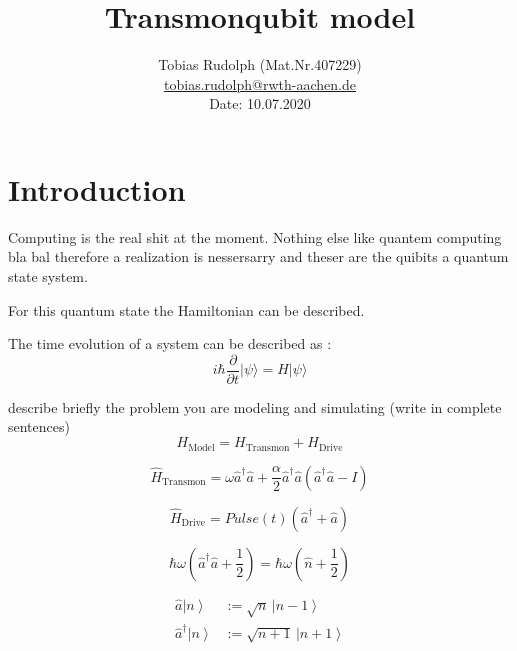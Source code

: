 \documentclass[journal]{IEEEtran} %
\newcommand{\mtx}[1]{\mathrm{#1}} %
\begin{document}
\title{Transmonqubit model}
%
\author{Tobias Rudolph (Mat.Nr.407229) \\ \href{mailto:tobias.rudolph@rwth-aachen.de}{tobias.rudolph@rwth-aachen.de} \\
Date: 10.07.2020
}

\maketitle
\begin{abstract}


\end{abstract}



\section{Introduction}\label{intro}
 Computing is the real shit at the moment. Nothing else like quantem computing bla bal therefore a realization is nessersarry and theser are the quibits a quantum state system. 


For this quantum state the Hamiltonian can be described.

The time evolution of a system can be described as :
$$
i\hbar \frac{\partial}{\partial t} |\psi\rangle=H|\psi\rangle
$$

describe briefly the problem you are modeling and simulating (write in complete sentences)
$$ H_{\mtx{Model}} = H_{\mtx{Transmon}} + H_{\mtx{Drive}}$$

$$ \hat H_{\mtx{Transmon}}= \omega\hat a^\dagger\hat a+ \frac{\alpha}{2}\hat a^\dagger\hat a\left(\hat a^\dagger\hat a - I\right)  $$

$$ \hat H_{\mtx{Drive}}= Pulse(t)\left(\hat a^\dagger+\hat a\right) $$


$$\hbar\omega\left(\hat a^\dagger\hat a+\frac{1}{2}\right) =\hbar\omega\left(\hat n+\frac{1}{2}\right) $$

\begin{align}\hat a\left|n\right\rangle&:=\sqrt{n}\,\left|n-1\right\rangle\\
\hat a^\dagger\left|n\right\rangle&:=\sqrt{n+1}\,\left|n+1\right\rangle
\end{align}
\end{document}
